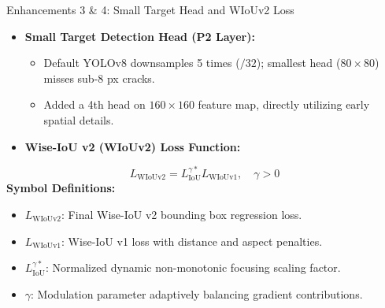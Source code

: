 \documentclass{beamer}
\begin{document}
\begin{frame}{Enhancements 3 \& 4: Small Target Head and WIoUv2 Loss}
\begin{itemize}
    \item \textbf{Small Target Detection Head (P2 Layer):}
    \begin{itemize}
        \item Default YOLOv8 downsamples 5 times ($/32$); smallest head ($80 \times 80$) misses sub-8 px cracks.
        \item Added a 4th head on $160 \times 160$ feature map, directly utilizing early spatial details.
    \end{itemize}
    \item \textbf{Wise-IoU v2 (WIoUv2) Loss Function:}
\end{itemize}
\vspace{-0.15cm}
\begin{equation*}
L_{\text{WIoUv2}} = L_{\text{IoU}}^{\gamma*} L_{\text{WIoUv1}}, \quad \gamma > 0
\end{equation*}
\vspace{-0.25cm}
\textbf{Symbol Definitions:}
\vspace{0.12cm}
\begin{itemize}
    \item $L_{\text{WIoUv2}}$: Final Wise-IoU v2 bounding box regression loss.
    \item $L_{\text{WIoUv1}}$: Wise-IoU v1 loss with distance and aspect penalties.
    \item $L_{\text{IoU}}^{\gamma*}$: Normalized dynamic non-monotonic focusing scaling factor.
    \item $\gamma$: Modulation parameter adaptively balancing gradient contributions.
\end{itemize}
\end{frame}
\end{document}
